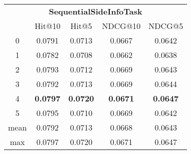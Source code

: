 \documentclass{article}
\begin{document}
 

\begin{tabular}{c|cccc}

\multicolumn{5}{c}{\textbf{SequentialSideInfoTask}} \\
\noalign{\smallskip}
\noalign{\smallskip}
\toprule
\multicolumn{1}{c}{Template ID} & \multicolumn{1}{|c}{Hit@10} & \multicolumn{1}{c}{Hit@5} & \multicolumn{1}{c}{NDCG@10} & \multicolumn{1}{c}{NDCG@5} \\
\midrule
0 & 0.0791 & 0.0713 & 0.0667 & 0.0642 \\
1 & 0.0782 & 0.0708 & 0.0662 & 0.0638 \\
2 & 0.0793 & 0.0712 & 0.0669 & 0.0643 \\
3 & 0.0792 & 0.0713 & 0.0669 & 0.0644 \\
4 & \textbf{0.0797} & \textbf{0.0720} & \textbf{0.0671} & \textbf{0.0647} \\
5 & 0.0795 & 0.0710 & 0.0669 & 0.0642 \\
\midrule
mean & 0.0792 & 0.0713 & 0.0668 & 0.0643 \\
max & 0.0797 & 0.0720 & 0.0671 & 0.0647 \\
\bottomrule

\end{tabular}
\end{document}
